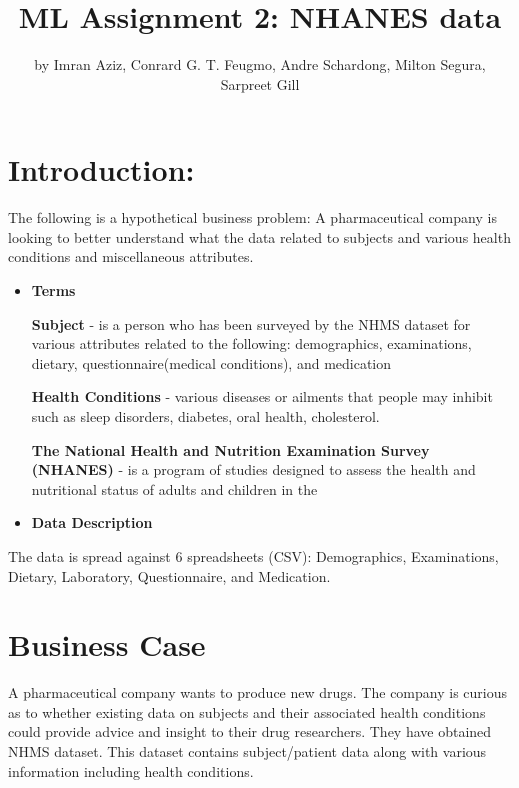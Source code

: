 \title{ML Assignment 2: NHANES data}
\author{by Imran Aziz, Conrard G. T. Feugmo, Andre Schardong, Milton Segura, Sarpreet Gill}

\maketitle



\newpage

\hypertarget{introduction}{%
\section{Introduction:}\label{introduction}}

The following is a hypothetical business problem: A pharmaceutical
company is looking to better understand what the data related to
subjects and various health conditions and miscellaneous attributes.

\begin{itemize}
\item
  \textbf{Terms}

  \textbf{Subject} - is a person who has been surveyed by the NHMS
  dataset for various attributes related to the following: demographics,
  examinations, dietary, questionnaire(medical conditions), and
  medication

  \textbf{Health Conditions} - various diseases or ailments that people
  may inhibit such as sleep disorders, diabetes, oral health,
  cholesterol.

  \textbf{The National Health and Nutrition Examination Survey (NHANES)}
  - is a program of studies designed to assess the health and
  nutritional status of adults and children in the
\item
  \textbf{Data Description}
\end{itemize}

The data is spread against 6 spreadsheets (CSV): Demographics,
Examinations, Dietary, Laboratory, Questionnaire, and Medication.

\hypertarget{business-case}{%
\section{Business Case}\label{business-case}}

A pharmaceutical company wants to produce new drugs. The company is
curious as to whether existing data on subjects and their associated
health conditions could provide advice and insight to their drug
researchers. They have obtained NHMS dataset. This dataset contains
subject/patient data along with various information including health
conditions.

